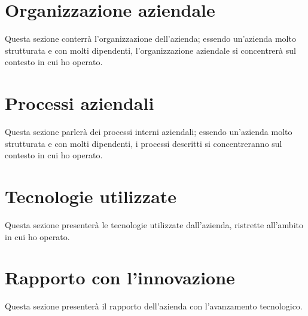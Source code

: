 \section{Organizzazione aziendale}
\label{sec:organizzazione_aziendale}
Questa sezione conterrà l'organizzazione dell'azienda; essendo un'azienda molto strutturata e con molti dipendenti, l'organizzazione aziendale si concentrerà sul contesto in cui ho operato.

\section{Processi aziendali}
\label{sec:processi_aziendali}
Questa sezione parlerà dei processi interni aziendali; essendo un'azienda molto strutturata e con molti dipendenti, i processi descritti si concentreranno sul contesto in cui ho operato.

\section{Tecnologie utilizzate}
\label{sec:tecnologie_utilizzate}
Questa sezione presenterà le tecnologie utilizzate dall'azienda, ristrette all'ambito in cui ho operato.

\section{Rapporto con l'innovazione}
\label{sec:rapporto_con_innovazione}
Questa sezione presenterà il rapporto dell'azienda con l'avanzamento tecnologico.
